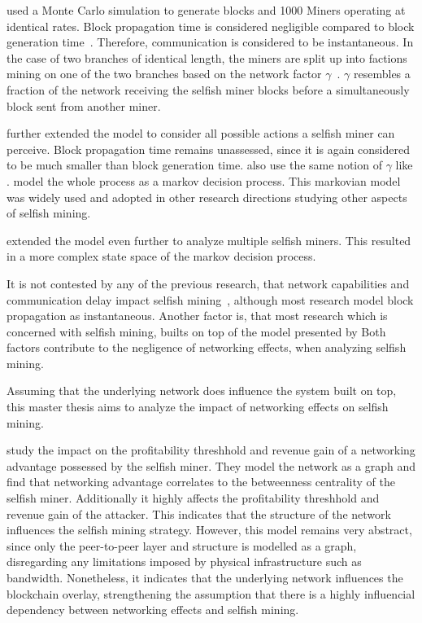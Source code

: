 \citeauthor{eyal} used a Monte Carlo simulation to generate blocks and 1000 Miners operating at identical rates. Block propagation time is considered negligible compared to block generation time~\cite{eyal}. Therefore, communication is considered to be instantaneous. In the case of two branches of identical length, the miners are split up into factions mining on one of the two branches based on the network factor $\gamma$~\cite{eyal}. $\gamma$ resembles a fraction of the network receiving the selfish miner blocks before a simultaneously block sent from another miner.

\citeauthor{optimal_sm} further extended the model to consider all possible actions a selfish miner can perceive. Block propagation time remains unassessed, since it is again considered to be much smaller than block generation time. \citeauthor{optimal_sm} also use the same notion of $\gamma$ like \citeauthor{eyal}. \citeauthor{optimal_sm} model the whole process as a markov decision process.
This markovian model was widely used and adopted in other research directions studying other aspects of selfish mining.

\citeauthor{deepDiveSM} extended the model even further to analyze multiple selfish miners. This resulted in a more complex state space of the markov decision process.

It is not contested by any of the previous research, that network capabilities and communication delay impact selfish mining~\cite{multi_sm}, although most research model block propagation as instantaneous.
Another factor is, that most research which is concerned with selfish mining, builts on top of the model presented by \citeauthor{optimal_sm}
Both factors contribute to the negligence of networking effects, when analyzing selfish mining.

Assuming that the underlying network does influence the system built on top, this master thesis aims to analyze the impact of networking effects on selfish mining.

\citet{xiao_modeling} study the impact on the profitability threshhold and revenue gain of a networking advantage possessed by the selfish miner. They model the network as a graph and find that networking advantage correlates to the betweenness centrality of the selfish miner. Additionally it highly affects the profitability threshhold and revenue gain of the attacker. This indicates that the structure of the network influences the selfish mining strategy. However, this model remains very abstract, since only the peer-to-peer layer and structure is modelled as a graph, disregarding any limitations imposed by physical infrastructure such as bandwidth. Nonetheless, it indicates that the underlying network influences the blockchain overlay, strengthening the assumption that there is a highly influencial dependency between networking effects and selfish mining.

